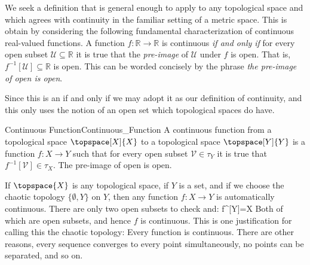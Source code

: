 \documentclass{book}                                                           %
\begin{document}
                \hfill
                \begin{minipage}[t]{0.50\textwidth}
                    We seek a definition that is general enough to apply to any
                    topological space and which agrees with continuity in the
                    familiar setting of a metric space. This is obtain by
                    considering the following fundamental characterization of
                    continuous real-valued functions. A function
                    $f:\mathbb{R}\rightarrow\mathbb{R}$ is continuous
                    \textit{if and only if} for every open subset
                    $\mathcal{U}\subseteq\mathbb{R}$ it is true that the
                    \textit{pre-image} of $\mathcal{U}$ under $f$ is open. That
                    is, $f^{\minus{1}}[\mathcal{U}]\subseteq\mathbb{R}$ is open.
                    This can be worded concisely by the phrase
                    \textit{the pre-image of open is open}.
                \end{minipage}
                \par\hfill\par
                Since this is an if and only if we may adopt it as our
                definition of continuity, and this only uses the notion of an
                open set which topological spaces do have.
                \begin{fdefinition}{Continuous Function}{Continuous_Function}
                    A continuous function from a topological space
                    $\topspace[X]{X}$ to a topological space $\topspace[Y]{Y}$
                    is a function $f:X\rightarrow{Y}$ such that for every open
                    subset $\mathcal{V}\in\tau_{Y}$ it is true that
                    $f^{\minus{1}}[\mathcal{V}]\in\tau_{X}$. The pre-image of
                    open is open.
                \end{fdefinition}
                \begin{example}
                    If $\topspace{X}$ is any topological space, if
                    $Y$ is a set, and if we choose the chaotic topology
                    $\{\emptyset,Y\}$ on $Y$, then any function
                    $f:X\rightarrow{Y}$ is automatically continuous. There are
                    only two open subsets to check and:
                                {f^{}[Y]=X}
                    Both of which are open subsets, and hence $f$ is continuous.
                    This is one justification for calling this the chaotic
                    topology: Every function is continuous. There are other
                    reasons, every sequence converges to every point
                    simultaneously, no points can be separated, and so on.
                \end{example}
\end{document}
